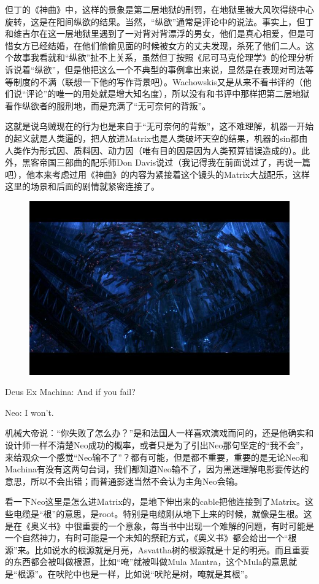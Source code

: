 \documentclass[UTF8]{ctexart}
\newenvironment{myquote}{\color{green} \setlength{\leftskip}{6em} \setlength{\rightskip}{4em} \setlength{\parindent}{-2em}}{\par}
\begin{document}
但丁的《神曲》中，这样的景象是第二层地狱的刑罚，在地狱里被大风吹得绕中心旋转，这是在阳间纵欲的结果。当然，“纵欲”通常是评论中的说法。事实上，但丁和维吉尔在这一层地狱里遇到了一对背对背漂浮的男女，他们是真心相爱，但是可惜女方已经结婚，在他们偷偷见面的时候被女方的丈夫发现，杀死了他们二人。这个故事我看就和“纵欲”扯不上关系，虽然但丁按照《尼可马克伦理学》的伦理分析诉说着“纵欲”，但是他把这么一个不典型的事例拿出来说，显然是在表现对司法等等制度的不满（联想一下他的写作背景吧）。Wachowskis又是从来不看书评的（他们说“评论”的唯一的用处就是增大知名度），所以没有和书评中那样把第二层地狱看作纵欲者的服刑地，而是充满了“无可奈何的背叛”。

这就是说乌贼现在的行为也是来自于“无可奈何的背叛”，这不难理解，机器一开始的起义就是人类逼的，把人放进Matrix也是人类破坏天空的结果，机器的sin都由人类作为形式因、质料因、动力因（唯有目的因是因为人类预算错误造成的）。此外，黑客帝国三部曲的配乐师Don Davis说过（我记得我在前面说过了，再说一篇吧），他本来考虑过用《神曲》的内容为紧接着这个镜头的Matrix大战配乐，这样这里的场景和后面的剧情就紧密连接了。

\begin{figure}[htb]
\centering
\includegraphics[width=0.5\linewidth]{fig/4c9bd62ac00a012cd42af1d3.jpg}
\end{figure}

\begin{myquote}
Deus Ex Machina: And if you fail?

Neo: I won't.
\end{myquote}

机械大帝说：“你失败了怎么办？”是和法国人一样喜欢演戏而问的，还是他确实和设计师一样不清楚Neo成功的概率，或者只是为了引出Neo那句坚定的“我不会”，来给观众一个感觉“Neo输不了”？都有可能，但是都不重要，重要的是无论Neo和Machina有没有这两句台词，我们都知道Neo输不了，因为黑迷理解电影要传达的意思，所以不会出错；而普通影迷当然不会认为主角Neo会输。

看一下Neo这里是怎么进Matrix的，是地下伸出来的cable把他连接到了Matrix。这些电缆是“根”的意思，是root。特别是电缆刚从地下上来的时候，就像是生根。这是在《奥义书》中很重要的一个意象，每当书中出现一个难解的问题，有时可能是一个自然神力，有时可能是一个未知的祭祀方式，《奥义书》都会给出一个“根源”来。比如说水的根源就是月亮，Asvattha树的根源就是十足的明亮。而且重要的东西都会被叫做根源，比如“唵”就被叫做Mula Mantra，这个Mula的意思就是“根源”。在吠陀中也是一样，比如说“吠陀是树，唵就是其根”。
\end{document}
